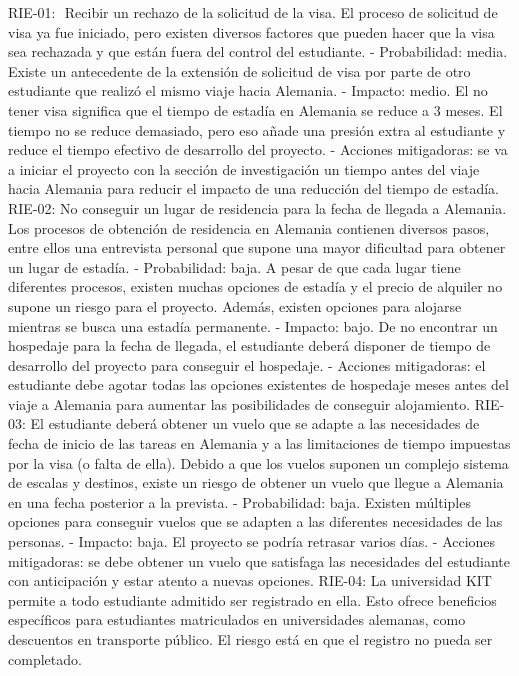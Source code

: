 RIE-01: ​ Recibir un rechazo de la solicitud de la visa. El proceso de solicitud de visa ya fue iniciado, pero
existen diversos factores que pueden hacer que la visa sea rechazada y que están fuera del control del
estudiante.
- Probabilidad: media. Existe un antecedente de la extensión de solicitud de visa por parte de otro
estudiante que realizó el mismo viaje hacia Alemania.
- Impacto: medio. El no tener visa significa que el tiempo de estadía en Alemania se reduce a 3
meses. El tiempo no se reduce demasiado, pero eso añade una presión extra al estudiante y
reduce el tiempo efectivo de desarrollo del proyecto.
- Acciones mitigadoras: se va a iniciar el proyecto con la sección de investigación un tiempo antes
del viaje hacia Alemania para reducir el impacto de una reducción del tiempo de estadía.
RIE-02: No conseguir un lugar de residencia para la fecha de llegada a Alemania. Los procesos de
obtención de residencia en Alemania contienen diversos pasos, entre ellos una entrevista personal que
supone una mayor dificultad para obtener un lugar de estadía.
- Probabilidad: baja. A pesar de que cada lugar tiene diferentes procesos, existen muchas
opciones de estadía y el precio de alquiler no supone un riesgo para el proyecto. Además,
existen opciones para alojarse mientras se busca una estadía permanente.
- Impacto: bajo. De no encontrar un hospedaje para la fecha de llegada, el estudiante deberá
disponer de tiempo de desarrollo del proyecto para conseguir el hospedaje.
- Acciones mitigadoras: el estudiante debe agotar todas las opciones existentes de hospedaje
meses antes del viaje a Alemania para aumentar las posibilidades de conseguir alojamiento.
RIE-03: El estudiante deberá obtener un vuelo que se adapte a las necesidades de fecha de inicio de las
tareas en Alemania y a las limitaciones de tiempo impuestas por la visa (o falta de ella). Debido a que los
vuelos suponen un complejo sistema de escalas y destinos, existe un riesgo de obtener un vuelo que
llegue a Alemania en una fecha posterior a la prevista.
- Probabilidad: baja. Existen múltiples opciones para conseguir vuelos que se adapten a las
diferentes necesidades de las personas.
- Impacto: baja. El proyecto se podría retrasar varios días.
- Acciones mitigadoras: se debe obtener un vuelo que satisfaga las necesidades del estudiante
con anticipación y estar atento a nuevas opciones.
RIE-04: La universidad KIT permite a todo estudiante admitido ser registrado en ella. Esto ofrece
beneficios específicos para estudiantes matriculados en universidades alemanas, como descuentos en
transporte público. El riesgo está en que el registro no pueda ser completado.
